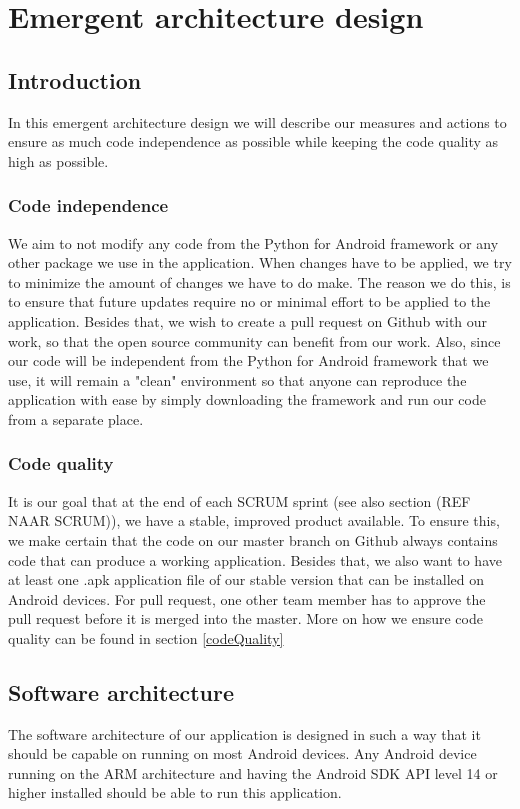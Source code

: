 \chapter{Emergent architecture design}

\section{Introduction}
In this emergent architecture design we will describe our measures and actions to ensure as much code independence as possible while keeping the code quality as high as possible.

\subsection{Code independence}
We aim to not modify any code from the Python for Android framework or any other package we use in the application. When changes have to be applied, we try to minimize the amount of changes we have to do make.
The reason we do this, is to ensure that future updates require no or minimal effort to be applied to the application.
Besides that, we wish to create a pull request on Github with our work, so that the open source community can benefit from our work.
Also, since our code will be independent from the Python for Android framework that we use, it will remain a "clean" environment so that anyone can reproduce the application with ease by simply downloading the framework and run our code from a separate place.

\subsection{Code quality}
It is our goal that at the end of each SCRUM sprint (see also section (REF NAAR SCRUM)), we have a stable, improved product available. To ensure this, we make certain that the code on our master branch on Github always contains code that can produce a working application. Besides that, we also want to have at least one .apk application file of our stable version that can be installed on Android devices. For pull request, one other team member has to approve the pull request before it is merged into the master.
More on how we ensure code quality can be found in section \ref{codeQuality}

\section{Software architecture}
 The software architecture of our application is designed in such a way that it should be capable on running on most Android devices. Any Android device running on the ARM architecture and having the Android SDK API level 14 or higher installed should be able to run this application.
 
